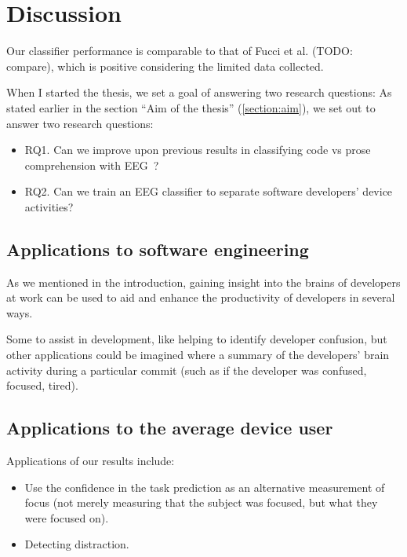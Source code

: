\section{Discussion}

Our classifier performance is comparable to that of Fucci et al. (TODO: compare), which is positive considering the limited data collected.

When I started the thesis, we set a goal of answering two research questions:
As stated earlier in the section ``Aim of the thesis'' (\ref{section:aim}), we set out to answer two research questions:

\begin{itemize}
        \item RQ1. Can we improve upon previous results in classifying code vs prose comprehension with EEG~?
        \item RQ2. Can we train an EEG classifier to separate software developers’ device activities?
\end{itemize}



\subsection{Applications to software engineering}

As we mentioned in the introduction, gaining insight into the brains of developers at work can be used to aid and enhance the productivity of developers in several ways.

Some to assist in development, like helping to identify developer confusion, but other applications could be imagined where a summary of the developers' brain activity during a particular commit (such as if the developer was confused, focused, tired).


\subsection{Applications to the average device user}


Applications of our results include:

\begin{itemize}
    \item Use the confidence in the task prediction as an alternative measurement of focus (not merely measuring that the subject was focused, but what they were focused on). 
    \item Detecting distraction.
\end{itemize}

